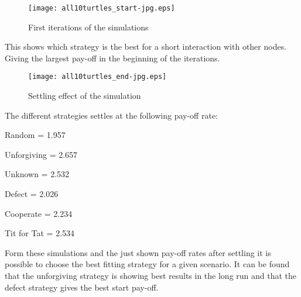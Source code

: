 \begin{figure}[!h]
  \centering
  \texttt{[image: all10turtles\_start-jpg.eps]}
  \caption{First iterations of the simulations}
  \label{fig:all10turtles_start-jpg}
\end{figure}
This shows which strategy is the best for a short interaction with other nodes. Giving the largest pay-off in the beginning of the iterations. 

\begin{figure}[!h]
  \centering
  \texttt{[image: all10turtles\_end-jpg.eps]}
  \caption{Settling effect of the simulation}
  \label{fig:all10turtles_end-jpg}
\end{figure}
\FloatBarrier

The different strategies settles at the following pay-off rate:
\begin{pitemize}
	\item Random = 1.957
	\item Unforgiving = 2.657
	\item Unknown = 2.532
	\item Defect = 2.026
	\item Cooperate = 2.234
	\item Tit for Tat = 2.534
\end{pitemize}

Form these simulations and the just shown pay-off rates after settling it is possible to choose the best fitting strategy for a given scenario. It can be found that the unforgiving strategy is showing best results in the long run and that the defect strategy gives the best start pay-off. 
\newpage 